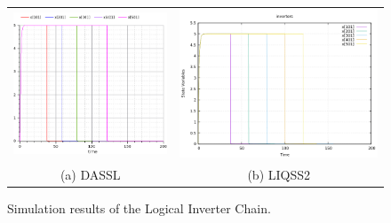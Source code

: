 \documentclass[10pt]{article}
\begin{document}
    \begin{figure}[htbp]\centering
		\begin{tabular}{cc}

   \includegraphics[scale=0.45]{./Fig/inv-om.png}&\includegraphics[scale=0.45]{./Fig/inv-liqss.png}\\(a) DASSL&(b) LIQSS2
    \end{tabular}
\vspace{-0.2cm}
\caption{Simulation results of the Logical Inverter Chain.}\label{Fig1}
\end{figure}
\end{document}
